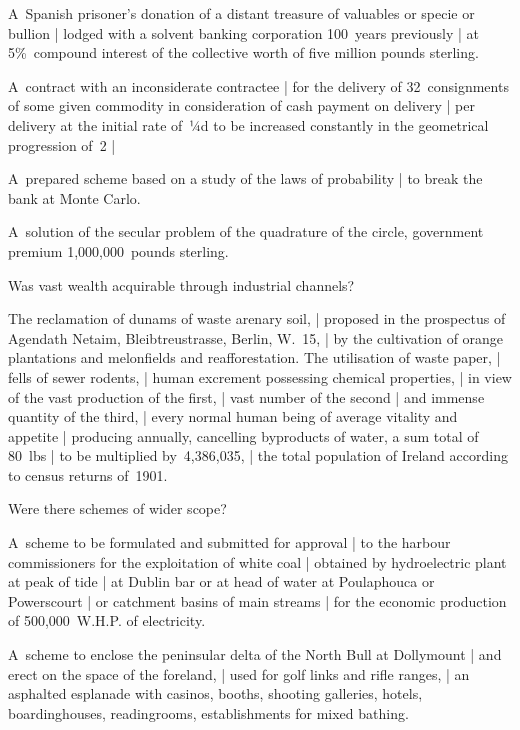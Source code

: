 \Household
A~Spanish prisoner's donation
of a distant treasure of valuables or specie or bullion |
lodged with a solvent banking corporation 100~years previously |
at 5\%~compound interest
of the collective worth of %
five million pounds sterling.

\Religious
A~contract with an inconsiderate contractee |
for the delivery of 32~consignments of some given commodity
in consideration of cash payment on delivery |
per delivery at the initial rate of~¼d
to be increased constantly in the geometrical progression of~2 |

\Places
A~prepared scheme based on a study of the laws of probability |
to break the bank at Monte Carlo.

\Science
A~solution of the secular problem of the quadrature of the circle,
government premium 1,000,000~pounds sterling.


Was vast wealth acquirable through industrial channels?

\Science
The reclamation of dunams of waste arenary soil, |
proposed in the prospectus of Agendath Netaim, Bleibtreustrasse, Berlin, W.~15, |
by the cultivation of orange plantations and melonfields and reafforestation.
The utilisation of waste paper, |
fells of sewer rodents, |
human excrement possessing chemical properties, |
in view of the vast production of the first, |
vast number of the second |
and immense quantity of the third, |
every normal human being of average vitality and appetite |
producing annually, cancelling byproducts of water, a sum total of 80~lbs
 |
to be multiplied by~4,386,035, |
the total population of Ireland according to census returns of~1901.


Were there schemes of wider scope?

\Religious
A~scheme to be formulated and submitted for approval |
to the harbour commissioners for the exploitation of white coal
 |
obtained by hydroelectric plant at peak of tide |
at Dublin bar or at head of water at Poulaphouca or Powerscourt |
or catchment basins of main streams |
for the economic production of 500,000~W.H.P. of electricity.

\Poetry
A~scheme to enclose the peninsular delta of the North Bull at Dollymount |
and erect on the space of the foreland, |
used for golf links and rifle ranges, |
an asphalted esplanade with casinos, booths, shooting galleries,
hotels, boardinghouses, readingrooms, establishments for mixed bathing.

